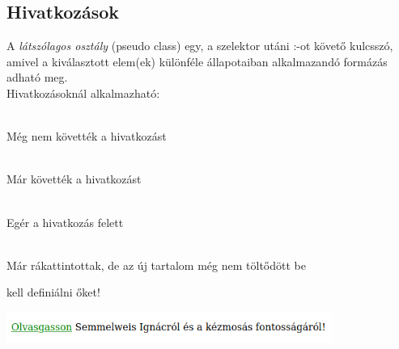 \subsection{Hivatkozások}

\begin{frame}
  A \emph{látszólagos osztály} (pseudo class) egy, a szelektor utáni 
  :-ot követő kulcsszó, amivel a kiválasztott elem(ek) különféle 
  állapotaiban alkalmazandó formázás adható meg.\\
  \vfill
  \vfill
  Hivatkozásoknál alkalmazható:
  \begin{description}[m]
    \item[\texttt{link}] \hfill \\ Még nem követték a hivatkozást
    \item[\texttt{visited}] \hfill \\ Már követték a hivatkozást
    \item[\texttt{hover}] \hfill \\ Egér a hivatkozás felett
    \item[\texttt{active}] \hfill \\ Már rákattintottak, de az új 
    tartalom még nem töltődött be
  \end{description}
   kell definiálni őket!
\end{frame}

%
\begin{frame}
  \begin{exampleblock}{}
    \scriptsize
    
    
  \end{exampleblock}
  \begin{center}
    \includegraphics[width=0.8\textwidth]{hivatkozas.png}
  \end{center}
\end{frame}
